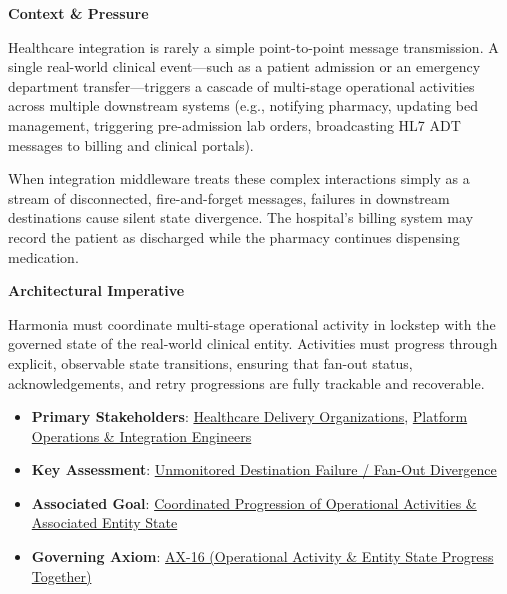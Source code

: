 \par\medskip\textbf{Context \& Pressure}\par


Healthcare integration is rarely a simple point-to-point message transmission. A single real-world clinical event—such as a patient admission or an emergency department transfer—triggers a cascade of multi-stage operational activities across multiple downstream systems (e.g., notifying pharmacy, updating bed management, triggering pre-admission lab orders, broadcasting HL7 ADT messages to billing and clinical portals).



When integration middleware treats these complex interactions simply as a stream of disconnected, fire-and-forget messages, failures in downstream destinations cause silent state divergence. The hospital's billing system may record the patient as discharged while the pharmacy continues dispensing medication.



\par\medskip\textbf{Architectural Imperative}\par


Harmonia must coordinate multi-stage operational activity in lockstep with the governed state of the real-world clinical entity. Activities must progress through explicit, observable state transitions, ensuring that fan-out status, acknowledgements, and retry progressions are fully trackable and recoverable.



\begin{itemize}


\item \textbf{Primary Stakeholders}: \href{\detokenize{../../../../../docs/markdown/01-motivation/stakeholders/enterprise-stakeholders.md}}{Healthcare Delivery Organizations}, \href{\detokenize{../../../../../docs/markdown/01-motivation/stakeholders/enterprise-stakeholders.md}}{Platform Operations \& Integration Engineers}

\item \textbf{Key Assessment}: \href{\detokenize{../../../../../docs/markdown/01-motivation/drivers-assessments/assessments.md}}{Unmonitored Destination Failure / Fan-Out Divergence}

\item \textbf{Associated Goal}: \href{\detokenize{../../../../../docs/markdown/01-motivation/goals-outcomes/strategic-goals.md}}{Coordinated Progression of Operational Activities \& Associated Entity State}

\item \textbf{Governing Axiom}: \hyperref[element:de7e90f46127455a9ec9ad3b9b48ba54]{AX-16 (Operational Activity \& Entity State Progress Together)}

\end{itemize}

